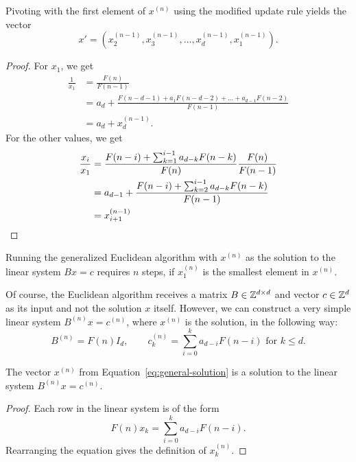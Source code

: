 \begin{lemma}
  Pivoting with the first element of $x^{(n)}$ using the modified update rule yields the vector
  \[
    x' = (x^{(n-1)}_2, x^{(n-1)}_3, \dots, x^{(n-1)}_d, x^{(n-1)}_1).
  \]
\end{lemma}

\begin{proof}
  For $x_1$, we get
  \[
    \begin{aligned}
      \frac{1}{x_1}
      & = \frac{F(n)}{F(n - 1)} \\
      & = a_d + \frac{F(n - d - 1) + a_1 F(n - d - 2) + \dots + a_{d-1} F(n - 2)}{F(n - 1)} \\
      & = a_d + x^{(n-1)}_d.
    \end{aligned}
  \]
  For the other values, we get
  \begin{align*}
    \frac{x_i}{x_1}
    & = \frac{F(n - i) + \sum_{k=1}^{i-1} a_{d-k} F(n - k)}{F(n)} \frac{F(n)}{F(n - 1)} \\
    & = a_{d-1} + \frac{F(n - i) + \sum_{k=2}^{i-1} a_{d-k} F(n - k)}{F(n-1)} \\
    & = x^{(n-1)}_{i+1} \qedhere
  \end{align*}
\end{proof}

\begin{corollary}
  Running the generalized Euclidean algorithm with $x^{(n)}$ as the solution to
  the linear system $B x = c$ requires $n$ steps, if $x^{(n)}_1$ is the
  smallest element in $x^{(n)}$.
\end{corollary}

Of course, the Euclidean algorithm receives a matrix $B \in {\mathbb Z}^{d \times d}$
and vector $c \in {\mathbb Z}^d$ as its input and not the solution $x$ itself.
However, we can construct a very simple linear system $B^{(n)} x = c^{(n)}$,
where $x^{(n)}$ is the solution, in the following way:
\[
  B^{(n)} = F(n) I_d, \qquad c^{(n)}_k = \sum_{i=0}^k a_{d-i} F(n - i) \text{ for } k ≤ d.
\]

\begin{lemma}
  The vector $x^{(n)}$ from Equation~\ref{eq:general-solution} is a solution to the
  linear system $B^{(n)} x = c^{(n)}$.
\end{lemma}

\begin{proof}
  Each row in the linear system is of the form
  \[
    F(n) x_k = \sum_{i = 0}^k a_{d-i} F(n - i).
  \]
  Rearranging the equation gives the definition of $x^{(n)}_k$.
\end{proof}

